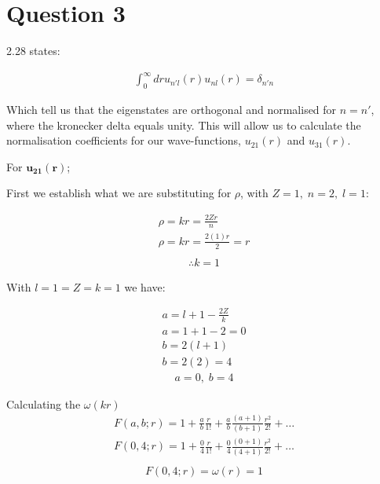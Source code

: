 \documentclass{article}
\begin{document}
\section{Question 3}

    2.28 states:

    \begin{gather}
        \int_{0}^{\infty}dr u_{n'l}(r) u_{nl}(r) = \delta_{n'n}
    \end{gather}
    
    Which tell us that the eigenstates are orthogonal and normalised for $n=n'$, where the kronecker delta equals unity.
    This will allow us to calculate the normalisation coefficients for our wave-functions, $u_{21}(r)$ and $u_{31}(r)$.\medskip

    For $\mathbf{u_{21}(r)}$;\smallskip

    First we establish what we are substituting for $\rho$, with $Z=1,\; n=2, \; l=1$:

    \begin{gather*}
        \rho = kr = \frac{2Zr}{n}\\
        \rho = kr = \frac{2(1)r}{2} = r\\
    \end{gather*}\vspace{-1.5cm}
    \begin{gather}
        \therefore k = 1
    \end{gather}
    

    With $l=1=Z=k=1$ we have:
    
    \begin{gather*} 
             a = l + 1 - \frac{2Z}{k}\\
             a = 1 + 1 - 2 = 0\\
             b = 2(l+1)\\
             b= 2(2) = 4
    \end{gather*}
    \begin{gather}
        a = 0, \; b= 4
    \end{gather}

    
    Calculating the $\omega(kr)$
    \begin{gather*}
        F(a,b;r) = 1 + \frac{a}{b}\frac{r}{1!} + \frac{a}{b}\frac{(a+1)}{(b+1)}\frac{r^2}{2!} + \dots\\
        F(0,4;r) = 1 + \frac{0}{4}\frac{r}{1!} + \frac{0}{4}\frac{(0+1)}{(4+1)}\frac{r^2}{2!} + \dots\\
    \end{gather*}\vspace{-1.5cm}
    \begin{gather}
        F(0,4;r) = \omega(r)=1 
    \end{gather}
\end{document}
